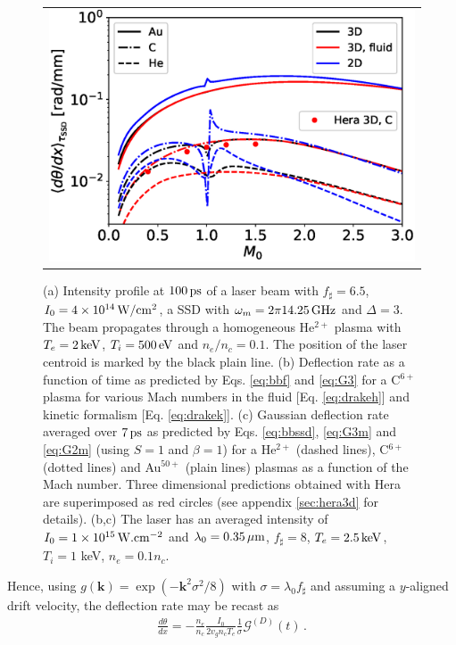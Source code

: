 \documentclass[%
 reprint,
 amsmath,amssymb,
 aps,
]{revtex4-1}
\begin{document}
\begin{figure}
\begin{tabular}{c}
\\\includegraphics[scale=0.45]{Fig1c.eps} \\
\end{tabular}
\caption{ \label{fig:2d3dnl}
(a) Intensity profile at $100\,\rm ps$ of a laser beam with $f_\sharp=6.5$, $I_0=4\times 10^{14}\,\rm W/cm^2$, a SSD with $\omega_m=2\pi14.25\,\rm GHz$ and  $\Delta=3$. The beam propagates through a homogeneous He$^{2+}$ plasma with $T_e=2\,\rm keV$, $T_i=500\,\rm eV$ and  $n_e/n_c=0.1$. The position of the laser centroid is marked by the black plain line.
(b) Deflection rate as a function of time as predicted by Eqs. \eqref{eq:bbf} and \eqref{eq:G3}  for a C$^{6+}$ plasma for various Mach numbers in the fluid [Eq. \eqref{eq:drakeh}] and kinetic formalism [Eq. \eqref{eq:drakek}].
(c) Gaussian deflection rate averaged over $7\,\rm ps$ as predicted by  Eqs. \eqref{eq:bbssd},  \eqref{eq:G3m} and \eqref{eq:G2m} (using $S=1$ and $\beta=1$)  for a He$^{2+}$ (dashed lines), C$^{6+}$ (dotted lines) and Au$^{50+}$ (plain lines) plasmas as a function of the Mach number. Three dimensional predictions obtained with Hera are superimposed as red circles (see appendix \ref{sec:hera3d} for details).
(b,c) The laser  has an averaged intensity of $I_0=1\times 10^{15}\,\rm W.cm^{-2}$ and $\lambda_0=0.35\, \rm \mu m$, $f_\sharp=8$,  $T_e=2.5\,\rm keV$, $T_i=1$ keV, $n_e=0.1 n_c$.
}
\end{figure}
Hence,  using $g(\mathbf{k})=\exp(-\mathbf{k}^2\sigma^2/8)$ with $\sigma =\lambda_0f_\sharp$   and assuming a $y$-aligned drift velocity, the deflection rate may be recast as 
  \begin{align}
  \frac{d\theta}{dx}=  -\frac{n_e }{n_c} \frac{ I_0 }{ 2 v_g n_c T_e } \frac{1}{\sigma}\mathcal{G}^{(D)}(t)\, .\label{eq:bbf} 
  \end{align}
\end{document}
